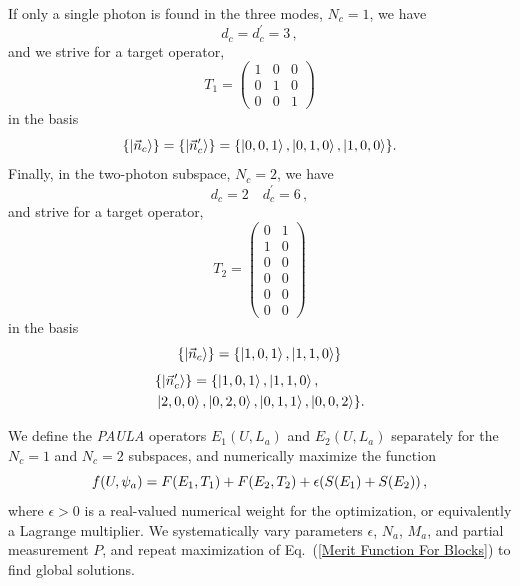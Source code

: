 \documentclass[aps,pra,twocolumn,superscriptaddress,floatfix,10pt]{revtex4}
\begin{document}
If only a single photon is found in the three modes, $N_c=1$, we have
\begin{equation}
d_c = d_c^\prime = 3\,,
\end{equation}
and we strive for a target operator,
\begin{equation}
\label{T1 1C2T}
T_1=	\begin{pmatrix} 1 & 0 & 0  \\ 0 & 1 & 0  \\ 0 & 0 & 1   \end{pmatrix}  
\end{equation}
in the basis
\begin{equation}
\{ \ket{\vec{n}_c} \} = \{ \ket{\vec{n}_c^\prime} \} = \{ \ket{0,0,1},\ket{0,1,0},\ket{1,0,0} \}.
\end{equation}
Finally, in the two-photon subspace, $N_c=2$, we have
\begin{equation}
d_c = 2 \quad d_c^\prime = 6 \,,
\end{equation}
and strive for a target operator,
\begin{equation}
\label{T2 1C2T}
T_2=\begin{pmatrix} 0 & 1  \\ 1 & 0  \\ 0 & 0 \\ 0 & 0 \\ 0 & 0 \\ 0 & 0   \end{pmatrix}  
\end{equation}
in the basis
\begin{equation}
\{ \ket{\vec{n}_c} \} = \{ \ket{1,0,1},\ket{1,1,0} \}
\end{equation}
\begin{eqnarray}
& \{ \ket{\vec{n}^\prime_c } \} = \{ \ket{1,0,1},\ket{1,1,0}, \\ &\ket{2,0,0},\ket{0,2,0},\ket{0,1,1},\ket{0,0,2} \}. \nonumber
\end{eqnarray}

We define the \textit{PAULA} operators  $E_1(U,L_a)$ and  $E_2(U,L_a)$ separately for the $N_c=1$ and $N_c=2$ subspaces,
and numerically maximize the function
\begin{equation}
\label{Merit Function For Blocks}
\small f(U,\psi_a) = F(E_1,T_1) + F(E_2,T_2) +\epsilon (S(E_1) + S(E_2) ) \,,
\end{equation}
where $\epsilon > 0$ is a real-valued numerical weight for the optimization, or equivalently a Lagrange multiplier. We systematically vary parameters $\epsilon$, $N_a$, $M_a$, and partial measurement $P$, and repeat maximization of Eq.~(\ref{Merit Function For Blocks}) to find global solutions.
\end{document}
